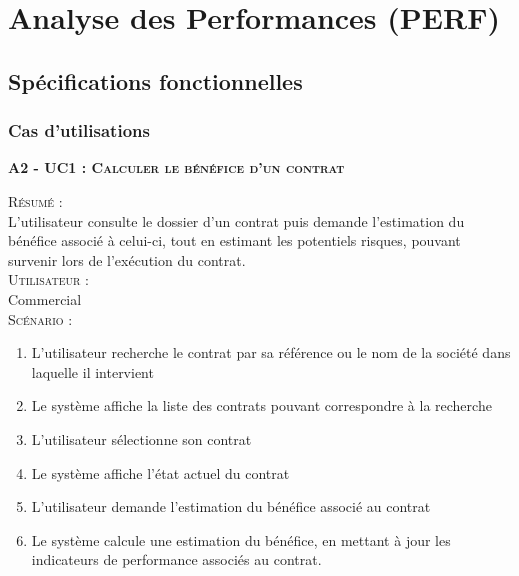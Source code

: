 
\section{Analyse des Performances (PERF)}%

\subsection{Spécifications fonctionnelles}

\subsubsection{Cas d’utilisations}

\noindent\textsc{\bf{A2 - UC1 :} Calculer le bénéfice d’un contrat}
\begin{shaded}
\noindent\textsc{Résumé :}\\

L’utilisateur consulte le dossier d’un contrat puis demande l’estimation du bénéfice associé à celui-ci, tout en estimant les potentiels risques, pouvant survenir lors de l’exécution du contrat. \\

\noindent\textsc{Utilisateur :} \\

Commercial \\

\noindent\textsc{Scénario :} \\
\begin{enumerate}
    \item L’utilisateur recherche le contrat par sa référence ou le nom de la société dans laquelle il intervient
    \item Le système affiche la liste des contrats pouvant correspondre à la recherche
    \item L’utilisateur sélectionne son contrat
    \item Le système affiche l’état actuel du contrat
    \item L’utilisateur demande l’estimation du bénéfice associé au contrat
    \item Le système calcule une estimation du bénéfice, en mettant à jour les indicateurs de performance associés au contrat.
\end{enumerate}
\end{shaded}

